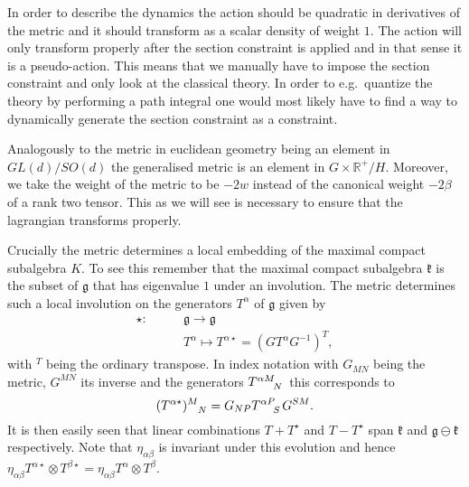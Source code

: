 In order to describe the dynamics the action should be quadratic in derivatives of the metric and it should transform as a scalar density of weight $1$. The action will only transform properly after the section constraint is applied and in that sense it is a pseudo-action. This means that we manually have to impose the section constraint and only look at the classical theory. In order to e.g.\ quantize the theory by performing a path integral one would most likely have to find a way to dynamically generate the section constraint as a constraint. 

Analogously to the metric in euclidean geometry being an element in $GL(d)/SO(d)$ the generalised metric is an element in $G\times \mathbb{R}^+/H$. Moreover, we take the weight of the metric to be $-2w$ instead of the canonical weight $-2\beta$ of a rank two tensor. This as we will see is necessary to ensure that the lagrangian transforms properly. 


Crucially the metric determines a local embedding of the maximal compact subalgebra $K$. To see this remember that the maximal compact subalgebra $\mathfrak{k}$ is the subset of $\mathfrak{g}$ that has eigenvalue $1$ under an involution. The metric determines such a local involution on the generators $T^\alpha$ of $\mathfrak{g}$ given by 
\begin{equation}
    \begin{aligned}
    \star:\qquad &\mathfrak{g}\to\mathfrak{g}\\
           &T^\alpha \mapsto T^{\alpha \star} = (GT^\alpha G^{-1})^T,
    \end{aligned}
\end{equation}
with $^T$ being the ordinary transpose. In index notation with $G_{MN}$ being the metric, $G^{MN}$ its inverse and the generators $\tensor{T}{^{\alpha M}_N}$ this corresponds to 
\begin{equation}
    (\tensor{T}{^{\alpha\star}})\tensor{}{^M_N} = G_{NP}\tensor{T}{^{\alpha P}_S}G^{SM}.
\end{equation}
It is then easily seen that linear combinations $T+T^\star$ and $T-T^\star$ span $\mathfrak{k}$ and $\mathfrak{g}\ominus\mathfrak{k}$ respectively. Note that $\eta_{\alpha\beta}$ is invariant under this evolution and hence $\eta_{\alpha\beta}T^{\alpha\star}\otimes T^{\beta\star}=\eta_{\alpha\beta}T^{\alpha}\otimes T^{\beta}$.

